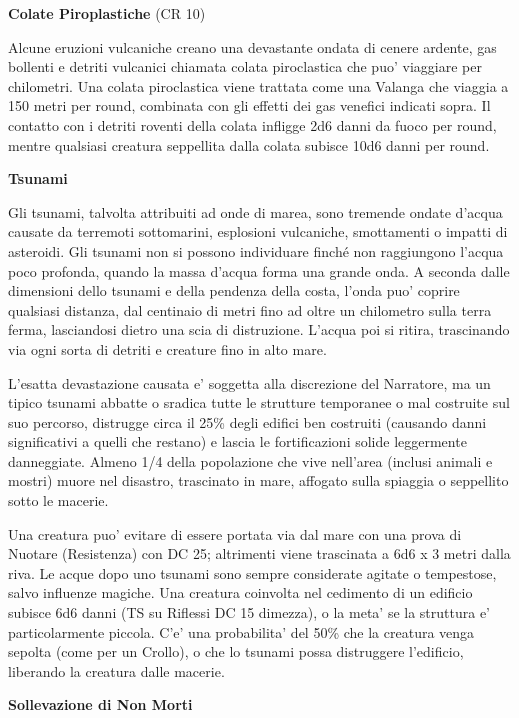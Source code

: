\documentclass[a4paper,11pt,twoside,openany]{book}
\begin{document}
{\textbf{Colate Piroplastiche} (CR 10)

Alcune eruzioni vulcaniche creano una devastante ondata di cenere ardente, gas bollenti e detriti vulcanici chiamata colata piroclastica che puo' viaggiare per chilometri. Una colata piroclastica viene trattata come una Valanga che viaggia a 150 metri per round, combinata con gli effetti dei gas venefici indicati sopra. Il contatto con i detriti roventi della colata infligge 2d6 danni da fuoco per round, mentre qualsiasi creatura seppellita dalla colata subisce 10d6 danni per round.

\textbf{Tsunami}

Gli tsunami, talvolta attribuiti ad onde di marea, sono tremende ondate d'acqua causate da terremoti sottomarini, esplosioni vulcaniche, smottamenti o impatti di asteroidi. Gli tsunami non si possono individuare finché non raggiungono l'acqua poco profonda, quando la massa d'acqua forma una grande onda. A seconda dalle dimensioni dello tsunami e del­la pendenza della costa, l'onda puo' coprire qualsiasi distanza, dal centinaio di metri fino ad oltre un chilometro sulla terra ferma, lasciandosi dietro una scia di distruzione. L'acqua poi si ritira, trascinando via ogni sorta di detriti e creature fino in alto mare.

L'esatta devastazione causata e' soggetta alla discrezione del Narratore, ma un tipico tsunami abbatte o sradica tutte le strutture temporanee o mal costruite sul suo percorso, distrugge circa il 25\% degli edifici ben costruiti (causando danni significativi a quelli che restano) e lascia le fortificazioni solide leggermente danneggiate. Almeno 1/4 della popolazione che vive nell'area (inclusi animali e mostri) muore nel disastro, trascinato in mare, affogato sulla spiaggia o seppellito sotto le macerie.

Una creatura puo' evitare di essere portata via dal mare con una prova di Nuotare (Resistenza) con DC 25; altrimenti viene trascinata a 6d6 x 3 metri dalla riva. Le acque dopo uno tsunami sono sempre considerate agitate o tempestose, salvo influenze magiche. Una creatura coinvolta nel cedimento di un edificio subisce 6d6 danni (TS su Riflessi DC 15 dimezza), o la meta' se la struttura e' particolarmente piccola. C'e' una probabilita' del 50\% che la creatura venga sepolta (come per un Crollo), o che lo tsunami possa distruggere l'edificio, liberando la creatura dalle macerie.

\textbf{Sollevazione di Non Morti}

}
\end{document}
